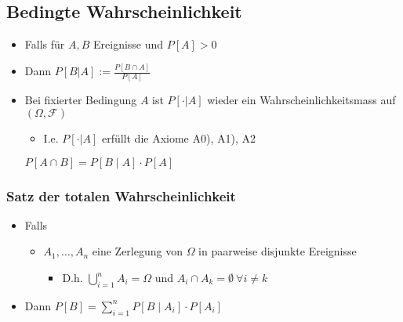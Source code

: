 \subsection{Bedingte Wahrscheinlichkeit}
\begin{itemize}
    \item Falls für $A,B$ Ereignisse und $P[A] > 0$
    \item Dann $P[B | A] := \frac{P[B \cap A]}{P[A]}$
     \item Bei fixierter Bedingung $A$ ist $P[\cdot | A]$ wieder ein Wahrscheinlichkeitsmass auf $(\Omega, \mathcal{F})$
        \begin{itemize}
            \item I.e. $P[\cdot | A]$ erfüllt die Axiome A0), A1), A2
        \end{itemize}
     $P[A \cap B] = P[B \mid A] \cdot P[A]$
\end{itemize}

\subsubsection{Satz der totalen Wahrscheinlichkeit}
\begin{itemize}
    \item Falls
        \begin{itemize}
            \item $A_1,\dots,A_n$ eine Zerlegung von $\Omega$ in paarweise disjunkte Ereignisse
                \begin{itemize}
                    \item D.h. $\bigcup_{i=1}^n A_i = \Omega$ und $A_i \cap A_k = \emptyset \: \forall i\neq k$
                \end{itemize}
        \end{itemize}
    \item Dann $ P[B] = \sum_{i=1}^n P[B \mid A_i] \cdot P[A_i]$
\end{itemize}

